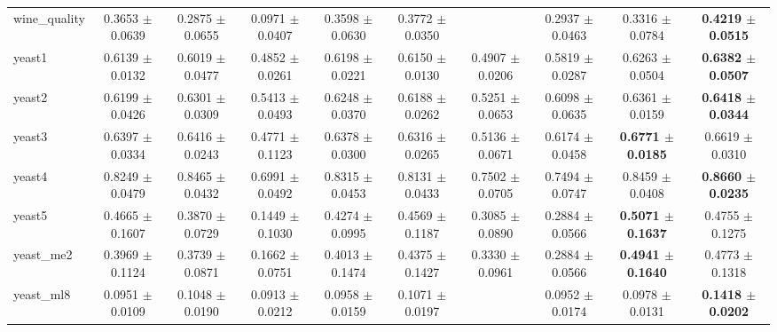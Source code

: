 \begin{table*}[htbp]
{\begin{tabular}{lccccccccc}
            wine\_quality & 0.3653 $\pm$ 0.0639 & 0.2875 $\pm$ 0.0655 & 0.0971 $\pm$ 0.0407 & 0.3598 $\pm$ 0.0630 & 0.3772 $\pm$ 0.0350 &  & 0.2937 $\pm$ 0.0463 & 0.3316 $\pm$ 0.0784 & \cellcolor{graybg}\textbf{0.4219 $\pm$ 0.0515} \\ 
            yeast1 & 0.6139 $\pm$ 0.0132 & 0.6019 $\pm$ 0.0477 & 0.4852 $\pm$ 0.0261 & 0.6198 $\pm$ 0.0221 & 0.6150 $\pm$ 0.0130 & 0.4907 $\pm$ 0.0206 & 0.5819 $\pm$ 0.0287 & 0.6263 $\pm$ 0.0504 & \cellcolor{graybg}\textbf{0.6382 $\pm$ 0.0507} \\ 
            yeast2 & 0.6199 $\pm$ 0.0426 & 0.6301 $\pm$ 0.0309 & 0.5413 $\pm$ 0.0493 & 0.6248 $\pm$ 0.0370 & 0.6188 $\pm$ 0.0262 & 0.5251 $\pm$ 0.0653 & 0.6098 $\pm$ 0.0635 & 0.6361 $\pm$ 0.0159 & \cellcolor{graybg}\textbf{0.6418 $\pm$ 0.0344} \\ 
            yeast3 & 0.6397 $\pm$ 0.0334 & 0.6416 $\pm$ 0.0243 & 0.4771 $\pm$ 0.1123 & 0.6378 $\pm$ 0.0300 & 0.6316 $\pm$ 0.0265 & 0.5136 $\pm$ 0.0671 & 0.6174 $\pm$ 0.0458 & \cellcolor{graybg}\textbf{0.6771 $\pm$ 0.0185} & 0.6619 $\pm$ 0.0310 \\ 
            yeast4 & 0.8249 $\pm$ 0.0479 & 0.8465 $\pm$ 0.0432 & 0.6991 $\pm$ 0.0492 & 0.8315 $\pm$ 0.0453 & 0.8131 $\pm$ 0.0433 & 0.7502 $\pm$ 0.0705 & 0.7494 $\pm$ 0.0747 & 0.8459 $\pm$ 0.0408 & \cellcolor{graybg}\textbf{0.8660 $\pm$ 0.0235} \\ 
            yeast5 & 0.4665 $\pm$ 0.1607 & 0.3870 $\pm$ 0.0729 & 0.1449 $\pm$ 0.1030 & 0.4274 $\pm$ 0.0995 & 0.4569 $\pm$ 0.1187 & 0.3085 $\pm$ 0.0890 & 0.2884 $\pm$ 0.0566 & \cellcolor{graybg}\textbf{0.5071 $\pm$ 0.1637} & 0.4755 $\pm$ 0.1275 \\ 
            yeast\_me2 & 0.3969 $\pm$ 0.1124 & 0.3739 $\pm$ 0.0871 & 0.1662 $\pm$ 0.0751 & 0.4013 $\pm$ 0.1474 & 0.4375 $\pm$ 0.1427 & 0.3330 $\pm$ 0.0961 & 0.2884 $\pm$ 0.0566 & \cellcolor{graybg}\textbf{0.4941 $\pm$ 0.1640} & 0.4773 $\pm$ 0.1318 \\ 
            yeast\_ml8 & 0.0951 $\pm$ 0.0109 & 0.1048 $\pm$ 0.0190 & 0.0913 $\pm$ 0.0212 & 0.0958 $\pm$ 0.0159 & 0.1071 $\pm$ 0.0197 &  & 0.0952 $\pm$ 0.0174 & 0.0978 $\pm$ 0.0131 & \cellcolor{graybg}\textbf{0.1418 $\pm$ 0.0202} \\ 
        \bottomrule
    \end{tabular}
    }
\end{table*}
